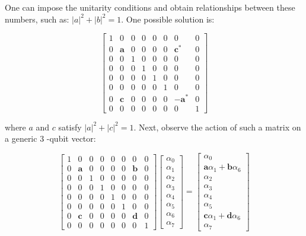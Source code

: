 \documentclass[main.tex]{subfiles}
\begin{document}
    One can impose the unitarity conditions and obtain relationships between these numbers, such as: $|a|^{2}+|b|^{2}=1$. One possible solution is:
    
    $$
    \left[\begin{array}{cccccccc}
    1 & 0 & 0 & 0 & 0 & 0 & 0 & 0 \\
    0 & \mathbf{a} & 0 & 0 & 0 & 0 & \mathbf{c}^{*} & 0 \\
    0 & 0 & 1 & 0 & 0 & 0 & 0 & 0 \\
    0 & 0 & 0 & 1 & 0 & 0 & 0 & 0 \\
    0 & 0 & 0 & 0 & 1 & 0 & 0 & 0 \\
    0 & 0 & 0 & 0 & 0 & 1 & 0 & 0 \\
    0 & \mathbf{c} & 0 & 0 & 0 & 0 & -\mathbf{a}^{*} & 0 \\
    0 & 0 & 0 & 0 & 0 & 0 & 0 & 1
    \end{array}\right]
    $$
    
    where $a$ and $c$ satisfy $|a|^{2}+|c|^{2}=1$. Next, observe the action of such a matrix on a generic 3 -qubit vector:
    
    $$
    \left[\begin{array}{llllllll}
    1 & 0 & 0 & 0 & 0 & 0 & 0 & 0 \\
    0 & \mathbf{a} & 0 & 0 & 0 & 0 & \mathbf{b} & 0 \\
    0 & 0 & 1 & 0 & 0 & 0 & 0 & 0 \\
    0 & 0 & 0 & 1 & 0 & 0 & 0 & 0 \\
    0 & 0 & 0 & 0 & 1 & 0 & 0 & 0 \\
    0 & 0 & 0 & 0 & 0 & 1 & 0 & 0 \\
    0 & \mathbf{c} & 0 & 0 & 0 & 0 & \mathbf{d} & 0 \\
    0 & 0 & 0 & 0 & 0 & 0 & 0 & 1
    \end{array}\right]\left[\begin{array}{c}
    \alpha_{0} \\
    \alpha_{1} \\
    \alpha_{2} \\
    \alpha_{3} \\
    \alpha_{4} \\
    \alpha_{5} \\
    \alpha_{6} \\
    \alpha_{7}
    \end{array}\right]=\left[\begin{array}{c}
    \alpha_{0} \\
    \mathbf{a} \alpha_{1}+\mathbf{b} \alpha_{6} \\
    \alpha_{2} \\
    \alpha_{3} \\
    \alpha_{4} \\
    \alpha_{5} \\
    \mathbf{c} \alpha_{1}+\mathbf{d} \alpha_{6} \\
    \alpha_{7}
    \end{array}\right]
    $$
    
\end{document}
